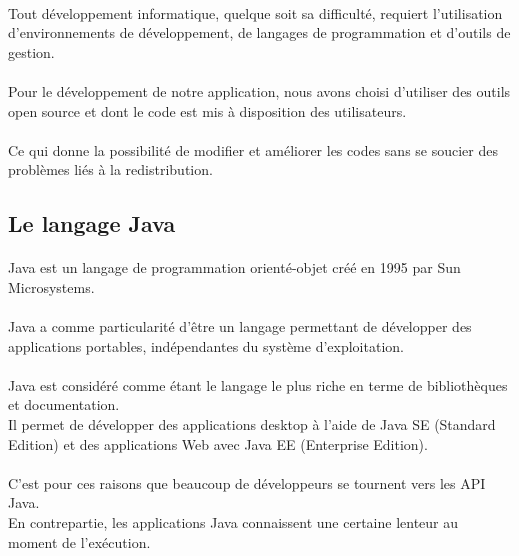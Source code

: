 \documentclass[12pt, a4paper, oneside]{book}
\begin{document}
\paragraph{}
Tout développement informatique, quelque soit sa difficulté, requiert l'utilisation d'environnements de développement, de langages de programmation et d'outils de gestion.
\paragraph{}
Pour le développement de notre application, nous avons choisi d'utiliser des outils open source et dont le code est mis à disposition des utilisateurs.
\paragraph{}
Ce qui donne la possibilité de modifier et améliorer les codes sans se soucier des problèmes liés à la redistribution.

\subsection{Le langage Java}
\paragraph{}
Java est un langage de programmation orienté-objet créé en 1995 par Sun Microsystems.
\paragraph{}
Java a comme particularité d'être un langage permettant de développer des applications portables, indépendantes du système d'exploitation. 
\paragraph{}
Java est considéré comme étant le langage le plus riche en terme de bibliothèques et documentation.\\
Il permet de développer des applications desktop à l'aide de Java SE (Standard Edition) et des applications Web avec Java EE (Enterprise Edition).
\paragraph{}
C'est pour ces raisons que beaucoup de développeurs se tournent vers les API Java.\\
En contrepartie, les applications Java connaissent une certaine lenteur au moment de l'exécution.
\end{document}
